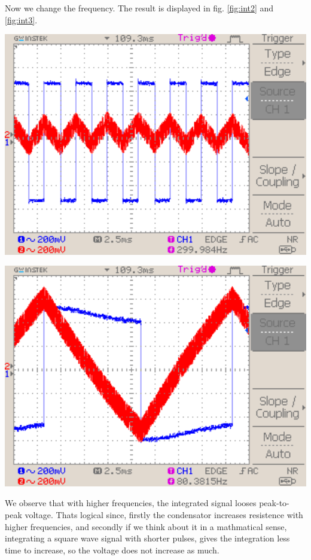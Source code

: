 \documentclass[a4paper,10pt]{article}
\newenvironment{Figure}
        {\par\medskip\noindent\minipage{\linewidth}}
        {\endminipage\par\medskip}
\numberwithin{equation}{section}
\begin{document}
\begin{multicols}{2}
  Now we change the frequency. The result is displayed in fig. \ref{fig:int2} and \ref{fig:int3}.
	\begin{Figure}
		\centering
		\includegraphics[width=1\textwidth]{../data/DS0033_n.png}
		\label{fig:int2}
	\end{Figure}
	\begin{Figure}
		\centering
		\includegraphics[width=1\textwidth]{../data/DS0034_n.png}
		\label{fig:int3}
	\end{Figure}
  We observe that with higher frequencies, the integrated signal looses peak-to-peak voltage. Thats logical since, firstly the condensator increases resistence with higher frequencies, and secondly if we think about it in a mathmatical sense, integrating a square wave signal with shorter pulses, gives the integration less time to increase, so the voltage does not increase as much.


\end{multicols}
\end{document}
